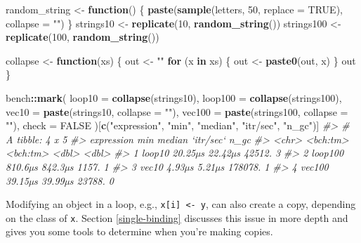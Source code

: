 \documentclass[]{book}
\newenvironment{Shaded}{\begin{snugshade}}{\end{snugshade}}
\newcommand{\CommentTok}[1]{\textcolor[rgb]{0.37,0.37,0.37}{\textit{#1}}}
\newcommand{\ControlFlowTok}[1]{\textcolor[rgb]{0.27,0.27,0.27}{\textbf{#1}}}
\newcommand{\DataTypeTok}[1]{\textcolor[rgb]{0.27,0.27,0.27}{#1}}
\newcommand{\DecValTok}[1]{\textcolor[rgb]{0.06,0.06,0.06}{#1}}
\newcommand{\KeywordTok}[1]{\textcolor[rgb]{0.27,0.27,0.27}{\textbf{#1}}}
\newcommand{\NormalTok}[1]{#1}
\newcommand{\OperatorTok}[1]{\textcolor[rgb]{0.43,0.43,0.43}{\textbf{#1}}}
\newcommand{\OtherTok}[1]{\textcolor[rgb]{0.37,0.37,0.37}{#1}}
\newcommand{\StringTok}[1]{\textcolor[rgb]{0.5,0.5,0.5}{#1}}
\begin{document}
\begin{Shaded}
\begin{Highlighting}[]
\NormalTok{random_string <-}\StringTok{ }\ControlFlowTok{function}\NormalTok{() \{}
  \KeywordTok{paste}\NormalTok{(}\KeywordTok{sample}\NormalTok{(letters, }\DecValTok{50}\NormalTok{, }\DataTypeTok{replace =} \OtherTok{TRUE}\NormalTok{), }\DataTypeTok{collapse =} \StringTok{""}\NormalTok{)}
\NormalTok{\}}
\NormalTok{strings10 <-}\StringTok{ }\KeywordTok{replicate}\NormalTok{(}\DecValTok{10}\NormalTok{, }\KeywordTok{random_string}\NormalTok{())}
\NormalTok{strings100 <-}\StringTok{ }\KeywordTok{replicate}\NormalTok{(}\DecValTok{100}\NormalTok{, }\KeywordTok{random_string}\NormalTok{())}

\NormalTok{collapse <-}\StringTok{ }\ControlFlowTok{function}\NormalTok{(xs) \{}
\NormalTok{  out <-}\StringTok{ ""}
  \ControlFlowTok{for}\NormalTok{ (x }\ControlFlowTok{in}\NormalTok{ xs) \{}
\NormalTok{    out <-}\StringTok{ }\KeywordTok{paste0}\NormalTok{(out, x)}
\NormalTok{  \}}
\NormalTok{  out}
\NormalTok{\}}

\NormalTok{bench}\OperatorTok{::}\KeywordTok{mark}\NormalTok{(}
  \DataTypeTok{loop10  =} \KeywordTok{collapse}\NormalTok{(strings10),}
  \DataTypeTok{loop100 =} \KeywordTok{collapse}\NormalTok{(strings100),}
  \DataTypeTok{vec10   =} \KeywordTok{paste}\NormalTok{(strings10, }\DataTypeTok{collapse =} \StringTok{""}\NormalTok{),}
  \DataTypeTok{vec100  =} \KeywordTok{paste}\NormalTok{(strings100, }\DataTypeTok{collapse =} \StringTok{""}\NormalTok{),}
  \DataTypeTok{check =} \OtherTok{FALSE}
\NormalTok{)[}\KeywordTok{c}\NormalTok{(}\StringTok{"expression"}\NormalTok{, }\StringTok{"min"}\NormalTok{, }\StringTok{"median"}\NormalTok{, }\StringTok{"itr/sec"}\NormalTok{, }\StringTok{"n_gc"}\NormalTok{)]}
\CommentTok{#> # A tibble: 4 x 5}
\CommentTok{#>   expression      min   median `itr/sec`  n_gc}
\CommentTok{#>   <chr>      <bch:tm> <bch:tm>     <dbl> <dbl>}
\CommentTok{#> 1 loop10      20.25µs  22.42µs    42512.     3}
\CommentTok{#> 2 loop100     810.6µs  842.3µs     1157.     1}
\CommentTok{#> 3 vec10        4.93µs   5.21µs   178078.     1}
\CommentTok{#> 4 vec100      39.15µs  39.99µs    23788.     0}
\end{Highlighting}
\end{Shaded}

Modifying an object in a loop, e.g., \texttt{x{[}i{]}\ \textless{}-\ y}, can also create a copy, depending on the class of \texttt{x}. Section \ref{single-binding} discusses this issue in more depth and gives you some tools to determine when you're making copies.
\end{document}
